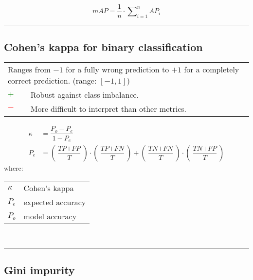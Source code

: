 \documentclass{article}
\makeatletter
\newenvironment{conditions}[1][where:]
	{\hspace{0.02\textwidth} #1 \begin{tabular}[t]{>{$}l<{$} @{${}={}$} l}}
	{\end{tabular}\\[\belowdisplayskip]}
\makeatother
\begin{document}
\begin{equation}
	\textit{mAP} = \dfrac{1}{n} \cdot \sum\nolimits_{i = 1}^n \textit{AP}_i
%
	\label{equation:mAP}
\end{equation}

\hrule


\subsection[Cohen's kappa for binary classification]{Cohen's kappa for binary classification \cite{cohen1960coefficient, ranganathan2017common, chicco2021matthews}}

\begin{table}[H]\centering
	\begin{tabular}{m{}m{}}
		\multicolumn{2}{m{0.95\textwidth}}{Ranges from $-1$ for a fully wrong prediction to $+1$ for a completely correct prediction. (range: $[-1, 1]$)} \\
		\textcolor{Green}{$+$} & Robust against class imbalance. \\
		\textcolor{Red}{$-$}   & More difficult to interpret than other metrics.
	\end{tabular}
\end{table}

\begin{equation}
	\begin{aligned}
		\kappa &= \dfrac{P_o - P_e}{1 - P_e} \\
		P_e    &= \left(\dfrac{\textit{TP} + \textit{FP}}{T}\right) \cdot \left(\dfrac{\textit{TP} + \textit{FN}}{T}\right) + \left(\dfrac{\textit{TN} + \textit{FN}}{T}\right) \cdot \left(\dfrac{\textit{TN} + \textit{FP}}{T}\right)
%
		\label{equation:k}
	\end{aligned}
\end{equation}
%
\begin{conditions}
	\kappa & Cohen's kappa \\
	P_e    & expected accuracy \\
	P_o    & model accuracy
\end{conditions}

\hrule


\subsection[Gini impurity]{Gini impurity \cite{gini1912variabilita, breiman1984classification, manek2017aspect}}
\end{document}
